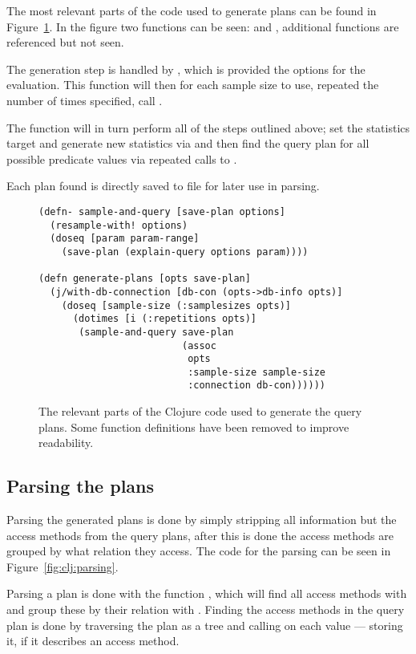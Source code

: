 The most relevant parts of the code used to generate plans can be found in
Figure~\ref{fig:clj:generating}. In the figure two functions can be seen:
 and , additional functions are
referenced but not seen.

The generation step is handled by , which is provided the
options for the evaluation. This function will then for each sample size to use,
repeated the number of times specified, call .

The  function will in turn perform all of the steps
outlined above; set the statistics target and generate new statistics via
 and then find the query plan for all possible predicate
values via repeated calls to .

Each plan found is directly saved to file for later use in parsing.

\begin{figure}[ht]
  \begin{verbatim}
(defn- sample-and-query [save-plan options]
  (resample-with! options)
  (doseq [param param-range]
    (save-plan (explain-query options param))))

(defn generate-plans [opts save-plan]
  (j/with-db-connection [db-con (opts->db-info opts)]
    (doseq [sample-size (:samplesizes opts)]
      (dotimes [i (:repetitions opts)]
       (sample-and-query save-plan
                         (assoc
                          opts
                          :sample-size sample-size
                          :connection db-con))))))
   \end{verbatim}
   \caption[The Clojure code to generate all query plans]{The relevant parts of the
     Clojure code used to generate the query plans. Some function definitions
     have been removed to improve readability.}
\label{fig:clj:generating}
\end{figure}

\subsection{Parsing the plans}\label{sec:parsing}
Parsing the generated plans is done by simply stripping all information but the
access methods from the query plans, after this is done the access methods are
grouped by what relation they access. The code for the parsing can be seen in
Figure~\ref{fig:clj:parsing}.

Parsing a plan is done with the function , which will find all
access methods with  and group these by their relation
with . Finding the access methods in the query plan is
done by traversing the plan as a tree and calling 
on each value --- storing it, if it describes an access method.

